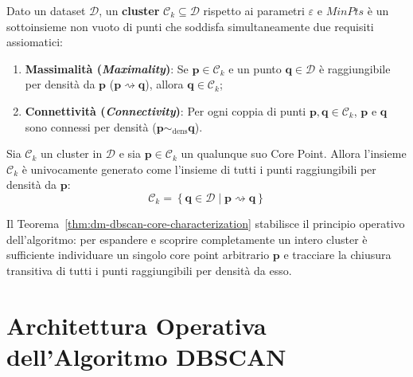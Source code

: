 \begin{definition}
Dato un dataset $\mathcal{D}$, un \textbf{cluster} $\mathcal{C}_k \subseteq \mathcal{D}$ rispetto ai parametri $\varepsilon$ e $MinPts$ è un sottoinsieme non vuoto di punti che soddisfa simultaneamente due requisiti assiomatici:
\begin{enumerate}
    \item \textbf{Massimalità (\textit{Maximality})}: Se $\mathbf{p} \in \mathcal{C}_k$ e un punto $\mathbf{q} \in \mathcal{D}$ è raggiungibile per densità da $\mathbf{p}$ ($\mathbf{p} \rightsquigarrow \mathbf{q}$), allora $\mathbf{q} \in \mathcal{C}_k$;
    \item \textbf{Connettività (\textit{Connectivity})}: Per ogni coppia di punti $\mathbf{p}, \mathbf{q} \in \mathcal{C}_k$, $\mathbf{p}$ e $\mathbf{q}$ sono connessi per densità ($\mathbf{p} \sim_{\mathrm{dens}} \mathbf{q}$).
\end{enumerate}
\end{definition}

\begin{theorem}
\label{thm:dm-dbscan-core-characterization}
Sia $\mathcal{C}_k$ un cluster in $\mathcal{D}$ e sia $\mathbf{p} \in \mathcal{C}_k$ un qualunque suo Core Point. Allora l'insieme $\mathcal{C}_k$ è univocamente generato come l'insieme di tutti i punti raggiungibili per densità da $\mathbf{p}$:
\begin{equation}
    \mathcal{C}_k = \left\{ \mathbf{q} \in \mathcal{D} \;\big|\; \mathbf{p} \rightsquigarrow \mathbf{q} \right\}
\end{equation}
\end{theorem}

Il Teorema~\ref{thm:dm-dbscan-core-characterization} stabilisce il principio operativo dell'algoritmo: per espandere e scoprire completamente un intero cluster è sufficiente individuare un singolo core point arbitrario $\mathbf{p}$ e tracciare la chiusura transitiva di tutti i punti raggiungibili per densità da esso.

\FloatBarrier
\section{Architettura Operativa dell'Algoritmo DBSCAN}
\label{sec:dm-dbscan-algorithm}


